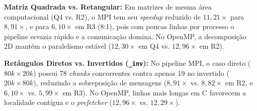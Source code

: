 \textbf{Matriz Quadrada vs. Retangular:} Em matrizes de mesma área computacional (Q4 vs. R2), o MPI tem seu \textit{speedup} reduzido de $11{,}21\times$ para $8{,}91\times$, e para $6{,}10\times$ em R3 (8:1), pois com poucas linhas por processo o pipeline esvazia rápido e a comunicação domina. No OpenMP, a decomposição 2D mantém o paralelismo estável ($12{,}30\times$ em Q4 vs. $12{,}96\times$ em R2).

\textbf{Retângulos Diretos vs. Invertidos (\texttt{\_inv}):} No pipeline MPI, o caso direto ($80k \times 20k$) possui 78 \textit{chunks} concorrentes contra apenas 19 no invertido ($20k \times 80k$), reduzindo a sobreposição de mensagens ($8{,}91\times$ vs. $8{,}82\times$ em R2, e $6{,}10\times$ vs. $5{,}99\times$ em R3). No OpenMP, linhas mais longas em C favorecem a localidade contígua e o \textit{prefetcher} ($12{,}96\times$ vs. $12{,}29\times$).
